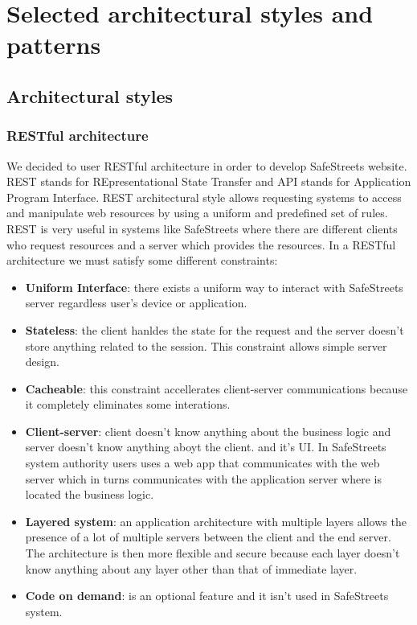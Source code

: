     \newpage
    \section{Selected architectural styles and patterns}  
        \subsection{Architectural styles}
    
            \subsubsection{RESTful architecture}
            We decided to user RESTful architecture in order to develop
            SafeStreets website. REST stands for REpresentational State Transfer
            and API stands for Application Program Interface. REST architectural
            style allows requesting systems to access and manipulate web
            resources by using a uniform and predefined set of rules. REST is
            very useful in systems like SafeStreets where there are different
            clients who request resources and a server which provides the
            resources.
            In a RESTful architecture we must satisfy some different constraints:
            \begin{itemize}
                \item \textbf{Uniform Interface}: there exists a uniform way to
                interact with SafeStreets server regardless user's device or
                application.
                \item \textbf{Stateless}: the client hanldes the state for the
                request and the server doesn't store anything related to the
                session. This constraint allows simple server design.
                \item \textbf{Cacheable}: this constraint accellerates
                client-server communications because it completely eliminates
                some interations.
                \item \textbf{Client-server}: client doesn't know anything about
                the business logic and server doesn't know anything aboyt the
                client. and it's UI. In SafeStreets system authority users uses
                a web app that communicates with the web server which in turns
                communicates with the application server where is located the
                business logic.
                \item \textbf{Layered system}: an application architecture with
                multiple layers allows the presence of a lot of multiple servers
                between the client and the end server. The architecture is then
                more flexible and secure because each layer doesn't know
                anything about any layer other than that of immediate layer.
                \item \textbf{Code on demand}: is an optional feature and it
                isn't used in SafeStreets system.
            \end{itemize}    

